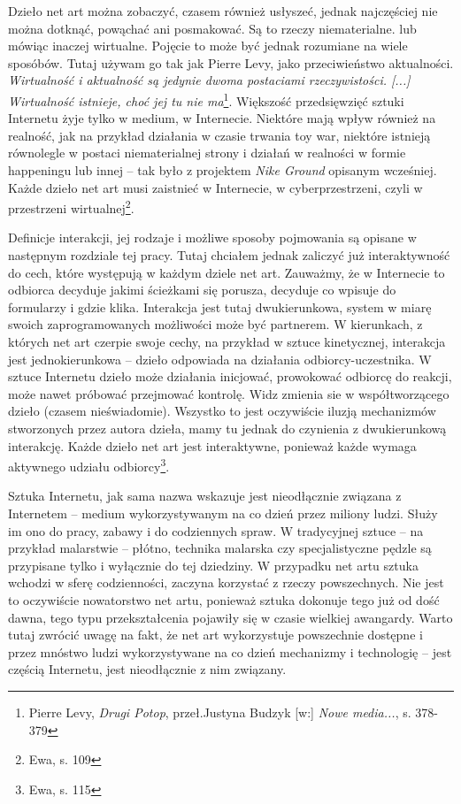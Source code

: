 \documentclass[a4paper,12pt,twoside]{article}
\begin{document}
Dzieło net art można zobaczyć, czasem również usłyszeć, jednak najczęściej
nie można dotknąć, powąchać ani posmakować. Są to rzeczy niematerialne.
lub mówiąc inaczej wirtualne. Pojęcie to może być jednak rozumiane na wiele
sposóbów. Tutaj używam go tak jak Pierre Levy, jako przeciwieństwo
aktualności. \textit{Wirtualność i aktualność są jedynie dwoma postaciami
rzeczywistości. [...] Wirtualność istnieje, choć jej tu nie
ma}\footnote{Pierre Levy, \textit{Drugi Potop}, przeł.Justyna Budzyk
[w:] \textit{Nowe media...}, s. 378-379}.
Większość przedsięwzięć sztuki Internetu
żyje tylko w medium, w Internecie. Niektóre mają wpływ również na
realność, jak na przykład działania w czasie trwania toy war, niektóre
istnieją równolegle w postaci niematerialnej strony i działań w realności
w formie happeningu lub innej -- tak było z projektem \textit{Nike Ground}
opisanym wcześniej. Każde dzieło net art musi zaistnieć w Internecie,
w cyberprzestrzeni, czyli w przestrzeni wirtualnej\footnote{Ewa, s. 109}.

Definicje interakcji, jej rodzaje i możliwe sposoby pojmowania są opisane
w następnym rozdziale tej pracy. Tutaj chciałem jednak zaliczyć już
interaktywność do cech, które występują w każdym dziele net art. Zauważmy,
że w Internecie to odbiorca decyduje jakimi ścieżkami się porusza,
decyduje co wpisuje do formularzy i gdzie klika. Interakcja jest tutaj
dwukierunkowa, system w miarę swoich zaprogramowanych możliwości może być
partnerem. W kierunkach, z których net art czerpie swoje cechy, na przykład
w sztuce kinetycznej, interakcja jest jednokierunkowa -- dzieło odpowiada
na działania odbiorcy-uczestnika. W sztuce Internetu dzieło może działania
inicjować, prowokować odbiorcę do reakcji, może nawet próbować przejmować
kontrolę. Widz zmienia sie w współtworzącego dzieło (czasem nieświadomie).
Wszystko to jest oczywiście iluzją mechanizmów stworzonych
przez autora dzieła, mamy tu jednak do czynienia z dwukierunkową interakcję.
Każde dzieło net art jest interaktywne, ponieważ każde wymaga aktywnego
udziału odbiorcy\footnote{Ewa, s. 115}.

Sztuka Internetu, jak sama nazwa wskazuje jest nieodłącznie związana
z Internetem -- medium wykorzystywanym na co dzień przez miliony ludzi.
Służy im ono do pracy, zabawy i do codziennych spraw.
W tradycyjnej sztuce -- na przykład
malarstwie -- płótno, technika malarska czy specjalistyczne pędzle są
przypisane tylko i wyłącznie do tej dziedziny. W przypadku net artu
sztuka wchodzi w sferę codzienności, zaczyna korzystać z rzeczy powszechnych.
Nie jest to oczywiście nowatorstwo net artu, ponieważ sztuka dokonuje
tego już od dość dawna, tego typu przekształcenia pojawiły się w czasie
wielkiej awangardy. Warto tutaj zwrócić uwagę na fakt, że net
art wykorzystuje powszechnie dostępne i przez mnóstwo ludzi wykorzystywane
na co dzień mechanizmy i technologię -- jest częścią Internetu, jest
nieodłącznie z nim związany.
\end{document}
